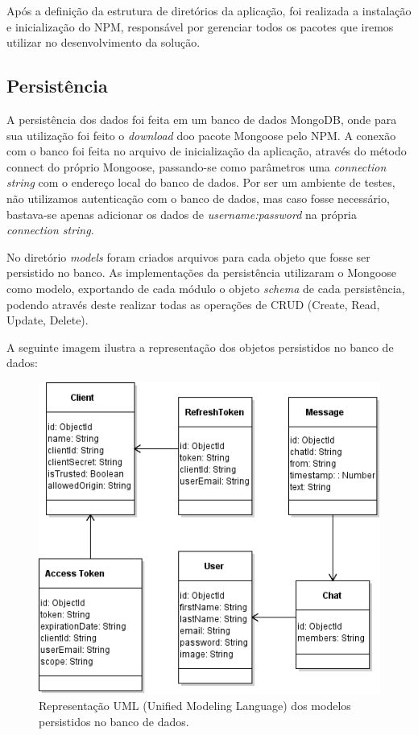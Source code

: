 Após a definição da estrutura de diretórios da aplicação, foi realizada a instalação e inicialização do NPM, responsável por gerenciar todos os pacotes que iremos utilizar no desenvolvimento da solução.

\subsection{Persistência}
A persistência dos dados foi feita em um banco de dados MongoDB, onde para sua utilização foi feito o \textit{download} doo pacote Mongoose pelo NPM. A conexão com o banco foi feita no arquivo de inicialização da aplicação, através do método connect do próprio Mongoose, passando-se como parâmetros uma \textit{connection string} com o endereço local do banco de dados. Por ser um ambiente de testes, não utilizamos autenticação com o banco de dados, mas caso fosse necessário, bastava-se apenas adicionar os dados de \textit{username:password} na própria \textit{connection string}.

No diretório \textit{models} foram criados arquivos para cada objeto que fosse ser persistido no banco. As implementações da persistência utilizaram o Mongoose como modelo, exportando de cada módulo o objeto \textit{schema} de cada persistência, podendo através deste realizar todas as operações de CRUD (Create, Read, Update, Delete).

A seguinte imagem ilustra a representação dos objetos persistidos no banco de dados:

\begin{figure}[!htb]
	\centering
	\includegraphics[scale=0.85]{imagens/models_uml.png}
	\caption{\small Representação UML (Unified Modeling Language) dos modelos persistidos no banco de dados.}
	\label{fig:modelsuml}
\end{figure}


